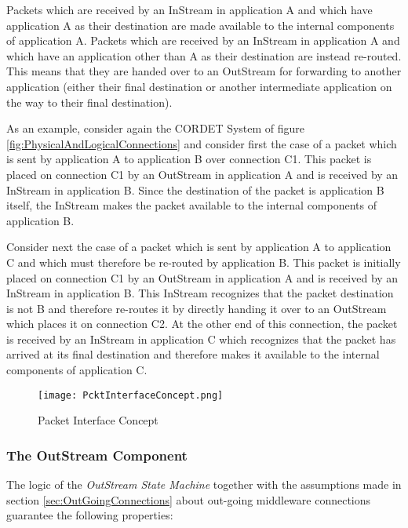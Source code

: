 \documentclass{pnp_article}
\begin{document}
Packets which are received by an InStream in application A and which have application A as their destination are made available to the internal components of application A. Packets which are received by an InStream in application A and which have an application other than A as their destination are instead re-routed. This means that they are handed over to an OutStream for forwarding to another application (either their final destination or another intermediate application on the way to their final destination).

As an example, consider again the CORDET System of figure \ref{fig:PhysicalAndLogicalConnections} and consider first the case of a packet which is sent by application A to application B over connection C1. This packet is placed on connection C1 by an OutStream in application A and is received by an InStream in application B. Since the destination of the packet is application B itself, the InStream makes the packet available to the internal components of application B.

Consider next the case of a packet which is sent by application A to application C and which must therefore be re-routed by application B. This packet is initially placed on connection C1 by an OutStream in application A and is received by an InStream in application B. This InStream recognizes that the packet destination is not B and therefore re-routes it by directly handing it over to an OutStream which places it on connection C2. At the other end of this connection, the packet is received by an InStream in application C which recognizes that the packet has arrived at its final destination and therefore makes it available to the internal components of application C. 

\begin{figure}[ht]
 \centering
 \texttt{[image: PcktInterfaceConcept.png]}
 \caption{Packet Interface Concept}
 \label{fig:PcktInterfaceConcept}
\end{figure}

\subsubsection{The OutStream Component}\label{sec:OutStream}


The logic of the \textit{OutStream State Machine} together with the assumptions made in section \ref{sec:OutGoingConnections} about out-going middleware connections guarantee the following properties:
\end{document}
